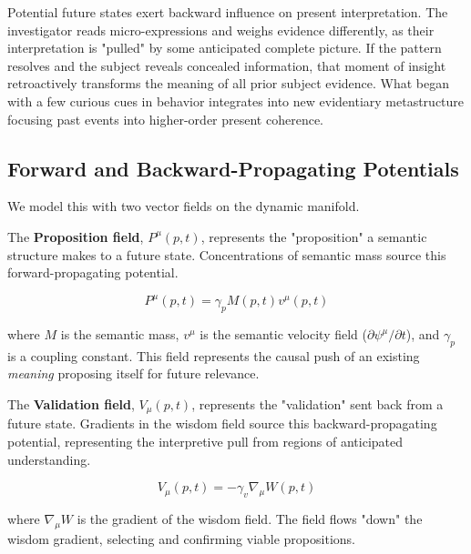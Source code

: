 Potential future states exert backward influence on present interpretation. The investigator reads micro-expressions and weighs evidence differently, as their interpretation is "pulled" by some anticipated complete picture. If the pattern resolves and the subject reveals concealed information, that moment of insight retroactively transforms the meaning of all prior subject evidence. What began with a few curious cues in behavior integrates into new evidentiary metastructure focusing past events into higher-order present coherence.


\subsection{Forward and Backward-Propagating Potentials}
\label{9.6.2:forward_and_backward_propagating_potentials}

We model this with two vector fields on the dynamic manifold.

The \textbf{Proposition field}, \(P^\mu(p,t)\), represents the "proposition" a semantic structure makes to a future state. Concentrations of semantic mass source this forward-propagating potential.

\begin{equation}
P^\mu(p,t) = \gamma_p M(p,t) v^\mu(p,t)
\end{equation}

where \(M\) is the semantic mass, \(v^\mu\) is the semantic velocity field (\(\partial\psi^\mu/\partial t\)), and \(\gamma_p\) is a coupling constant. This field represents the causal push of an existing \textit{meaning} proposing itself for future relevance.

The \textbf{Validation field}, \(V_\mu(p,t)\), represents the "validation" sent back from a future state. Gradients in the wisdom field source this backward-propagating potential, representing the interpretive pull from regions of anticipated understanding.

\begin{equation}
V_\mu(p,t) = -\gamma_v \nabla_\mu W(p,t)
\end{equation}

where \(\nabla_\mu W\) is the gradient of the wisdom field. The field flows "down" the wisdom gradient, selecting and confirming viable propositions.


